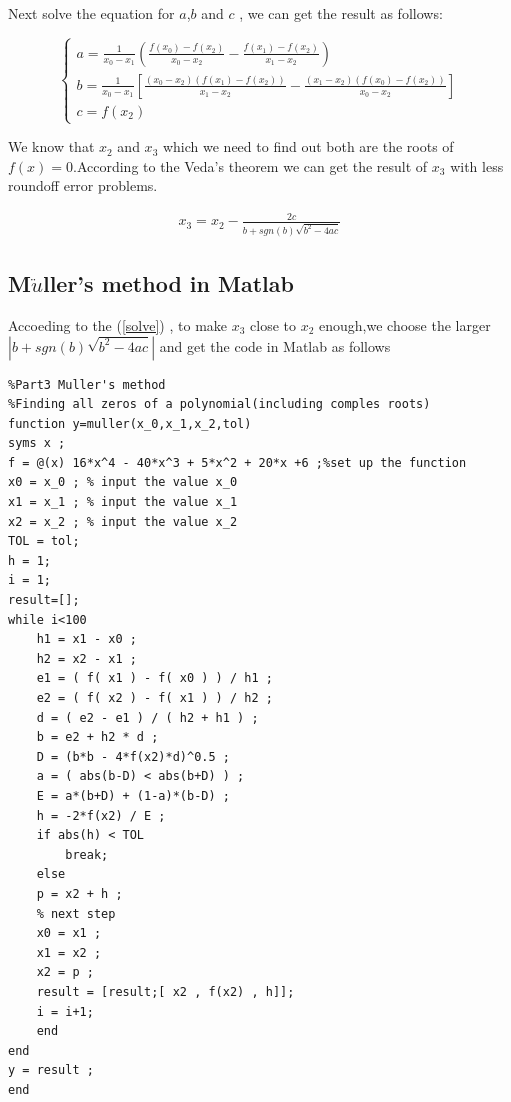 \documentclass{article}
\begin{document}
Next solve the equation for $a$,$b$ and $c$ , we can get the result as follows:




\begin{equation}
    \begin{cases}
        a = \frac{1}{x_0-x_1} \left( \frac{f(x_0)-f(x_2)}{x_0-x_2}-\frac{f(x_1)-f(x_2)}{x_1-x_2} \right) \\
        b = \frac{1}{x_0-x_1} \left[ \frac{(x_0-x_2)(f(x_1)-f(x_2))}{x_1-x_2} - \frac{(x_1-x_2)(f(x_0)-f(x_2))}{x_0-x_2}\right]\\ 
        c = f(x_2)
        \label{solve}
     \end{cases}
\end{equation}

We know that $x_2$ and $x_3$ which we need to find out both are the roots of $f(x)=0$.According to the Veda's theorem\cite{ref2} we can get the result of $x_3$ with less roundoff error problems.

\begin{align}
x_3 = x_2 - \frac{2c}{b+sgn(b)\sqrt{b^2-4ac}} \nonumber
\end{align}

\subsection{M$\ddot u$ller's method in Matlab}
Accoeding to the (\ref{solve}) , to make $x_3$ close to $x_2$ enough,we choose the larger $|b+sgn(b)\sqrt{b^2-4ac}|$\cite{ref1} and get the code in Matlab as follows

\begin{lstlisting}
%Part3 Muller's method
%Finding all zeros of a polynomial(including comples roots)
function y=muller(x_0,x_1,x_2,tol)
syms x ;
f = @(x) 16*x^4 - 40*x^3 + 5*x^2 + 20*x +6 ;%set up the function
x0 = x_0 ; % input the value x_0
x1 = x_1 ; % input the value x_1
x2 = x_2 ; % input the value x_2
TOL = tol;
h = 1;
i = 1;
result=[];
while i<100
    h1 = x1 - x0 ;
    h2 = x2 - x1 ;
    e1 = ( f( x1 ) - f( x0 ) ) / h1 ;
    e2 = ( f( x2 ) - f( x1 ) ) / h2 ;
    d = ( e2 - e1 ) / ( h2 + h1 ) ;
    b = e2 + h2 * d ;
    D = (b*b - 4*f(x2)*d)^0.5 ;
    a = ( abs(b-D) < abs(b+D) ) ;
    E = a*(b+D) + (1-a)*(b-D) ;
    h = -2*f(x2) / E ;
    if abs(h) < TOL
        break;
    else
    p = x2 + h ;
    % next step
    x0 = x1 ;
    x1 = x2 ;
    x2 = p ;
    result = [result;[ x2 , f(x2) , h]];
    i = i+1;
    end
end
y = result ;
end
\end{lstlisting}
\end{document}
